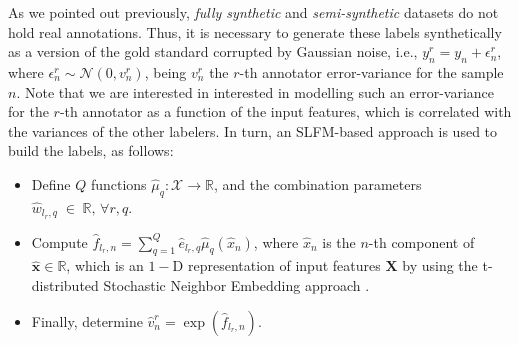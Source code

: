 \documentclass[9pt]{article}
\providecommand{\ve}[1]{{\bm{#1}}}%
\providecommand{\mat}[1]{{\bm{#1}}} %
\newcommand{\Real}{\mathbb{R}}
\DeclareMathOperator{\en}{\!\,\in\!\,}
\providecommand{\ve}[1]{{\mathbf{#1}}}
\providecommand{\mat}[1]{{\mathbf{#1}}}
\newcommand{\gauss}{\mathcal{N}} %
\begin{document}
As we pointed out previously, \textit{fully synthetic} and \textit{semi-synthetic} datasets do not hold real annotations. Thus, it is necessary to generate these labels synthetically as a version of the gold standard corrupted by Gaussian noise, i.e., $y_n^r = y_n +\epsilon^r_{n}$, where $\epsilon^r_{n}\sim \gauss(0, v^r_{n})$, being $v^r_{n}$ the $r$-th annotator error-variance for the sample $n$. Note that we are interested in interested in modelling such an error-variance for the $r$-th annotator as a function of the input features, which is correlated with the variances of the other labelers. In turn, an SLFM-based approach is used to build the labels, as follows:
\begin{itemize}
    \item Define $Q$ functions $\hat{\mu}_q:\mathcal{X}\to \Real$, and the combination parameters $\hat{w}_{l_r,q}\en\Real     ,\,\forall r, q$.
    \item Compute $\hat{f}_{l_r,n} = \sum_{q=1}^{Q}\hat{e}_{l_r,q}\hat{\mu}_q(\hat{x}_n)$, where $\hat{x}_n$ is the $n$-th component of $\hat{\ve{x}}\in \Real$, which is an $1-$D representation of input features $\mat{X}$ by using the t-distributed Stochastic Neighbor Embedding approach \cite{maaten2008visualizing}.
    \item Finally, determine $\hat{v}^r_n = \exp(\hat{f}_{l_r,n})$. 
\end{itemize}
\end{document}
